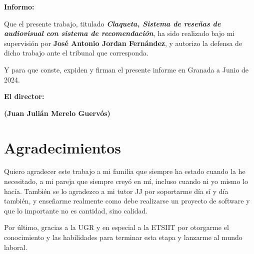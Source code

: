 \vspace{0.5cm}

\textbf{Informo:}

\vspace{0.5cm}

Que el presente trabajo, titulado \textit{\textbf{Claqueta, Sistema de reseñas de audiovisual con sistema de 
recomendación}}, ha sido realizado bajo mi supervisión por \textbf{José Antonio Jordan Fernández}, y autorizo la defensa 
de dicho trabajo ante el tribunal
que corresponda.

\vspace{0.5cm}

Y para que conste, expiden y firman el presente informe en Granada a Junio de 2024.

\vspace{1cm}

\textbf{El director: }

\vspace{5cm}

\noindent \textbf{(Juan Julián Merelo Guervós)}

\chapter*{Agradecimientos}

Quiero agradecer este trabajo a mi familia que siempre ha estado cuando la he necesitado, a mi pareja que siempre creyó 
en mí, incluso cuando ni yo mismo lo hacía.
También se lo agradezco a mi tutor JJ por soportarme día sí y día también, y enseñarme realmente como debe realizarse un proyecto de software y que lo importante no es cantidad, sino calidad.

Por último, gracias a la UGR y en especial a la ETSIIT por otorgarme el conocimiento y las habilidades para terminar esta etapa y lanzarme al mundo laboral.


